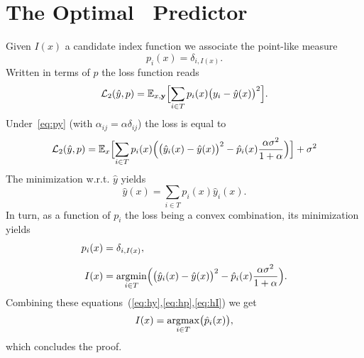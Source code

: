 \chapter{The Optimal \XX \ Predictor}\label{app:opred}
Given $I(x)$ a candidate index function we associate the point-like measure
\[
p_i(x) = \delta_{i,I(x)}.
\]
Written in terms of $p$ the loss function reads
\[
{\cal L}_2(\hat y,p) = {\mathbb E}_{x,{\bf y}}\Bigl[\sum_{i\in T} p_i(x)\bigl(y_i-\hat y(x)\bigr)^2\Bigr].
\]
Under~\cref{eq:py} (with $\alpha_{ij}=\alpha\delta_{ij}$) the loss is equal to
\[
{\cal L}_2(\hat y,p) = {\mathbb E}_x\Bigl[\sum_{i\in T} p_i(x)\Bigl( \bigl(\hat y_i(x)-\hat y(x)\bigr)^2-\hat p_i(x)\frac{\alpha\sigma^2}{1+\alpha}\Bigr)\Bigr]+\sigma^2
\]
The minimization w.r.t. $\hat y$ yields
\begin{equation}\label{eq:hy}
\hat y(x) = \sum_{i\in T} p_i(x)\hat y_i(x).
\end{equation}
In turn, as a function of $p_i$ the loss being a  convex combination, its minimization yields
\begin{align}
  p_i(x) &= \delta_{i,I(x)},\label{eq:hp}\\[0.2cm]
  I(x) &= \operatorname*{argmin}_{i\in T}\Bigl(\bigl(\hat y_i(x)-\hat y(x)\bigr)^2-\hat p_i(x)\frac{\alpha\sigma^2}{1+\alpha}\Bigr).\label{eq:hI}
\end{align}
Combining these equations~(\ref{eq:hy},\ref{eq:hp},\ref{eq:hI}) we get
\[
I(x) = \operatorname*{argmax}_{i\in T}\bigl(\hat p_i(x)\bigr),
\]
which concludes the proof.  
